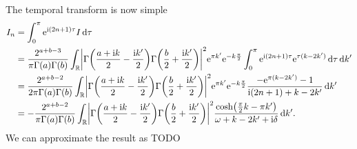 \documentclass[english, parskip=full]{scrartcl}
\begin{document}
The temporal transform is now simple
\begin{align}
I_n &= \intx{0}{\pi}{\powe{\i (2n+1) \tau} I}{\tau}\\
&= \frac{2^{a+b-3}}{\pi\Gamma(a)\Gamma(b)} \intr{\abs*{\Gamma\kla*{\frac{a+\i k}{2} - \frac{\i k'}{2}} \Gamma\kla*{\frac{b}{2} + \frac{\i k'}{2}}}^2 \powe{\pi k'} \powe{-k \frac{\pi}{2}} \intx{0}{\pi}{\powe{\i (2n+1)\tau} \powe{\tau (k-2k')}}{\tau} }{k'}\\
&= \frac{2^{a+b-2}}{2\pi\Gamma(a)\Gamma(b)} \intr{\abs*{\Gamma\kla*{\frac{a+\i k}{2} - \frac{\i k'}{2}} \Gamma\kla*{\frac{b}{2} + \frac{\i k'}{2}}}^2 \powe{\pi k'} \powe{-k \frac{\pi}{2}} \frac{-\powe{\pi (k-2k')} - 1}{\i (2n+1) + k - 2k'} }{k'}\\
&= -\frac{2^{a+b-2}}{\pi\Gamma(a)\Gamma(b)} \intr{\abs*{\Gamma\kla*{\frac{a+\i k}{2} - \frac{\i k'}{2}} \Gamma\kla*{\frac{b}{2} + \frac{\i k'}{2}}}^2 \frac{ \cosh\kla*{\frac{\pi}{2}k - \pi k'} }{\omega + k - 2k' + \i\delta} }{k'}.
\end{align}
We can approximate the result as TODO
\end{document}
